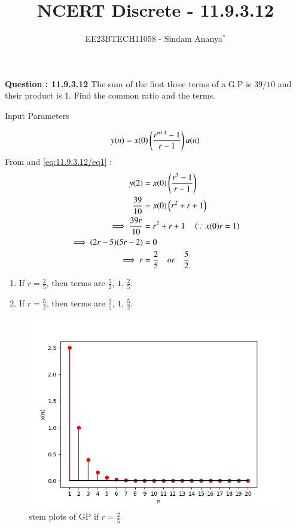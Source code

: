 \documentclass[journal,12pt,twocolumn]{IEEEtran}
\theoremstyle{remark}
\begin{document}

\vspace{3cm}

\title{NCERT Discrete - 11.9.3.12}
\author{EE23BTECH11058 - Sindam Ananya$^{*}$%
}
\maketitle
\newpage
\bigskip

\renewcommand{\thefigure}{\theenumi}
\renewcommand{\thetable}{\theenumi}

\vspace{3cm}
\textbf{Question : 11.9.3.12} 
The sum of the first three terms of a G.P is $39/10$ and their product is $1$. Find the common ratio and the terms.\\
\solution
\fi
\begin{table}[h!]
    \centering
    
    \caption{Input Parameters}
    \label{tab:11.9.3.12/table1}
\end{table}
\begin{equation}
y(n) = x(0)\left(\frac{r^{n+1}-1}{r-1}\right)u(n)
\label{eq:11.9.3.12/eq1}
\end{equation}
From  and \eqref{eq:11.9.3.12/eq1} :
\begin{align}
y(2) &= x(0)\left(\frac{r^3-1}{r-1}\right)\\
\frac{39}{10} &= x(0)\left(r^2+r+1\right)\\
\implies \frac{39r}{10} &= r^2+r+1 \quad \left(\because x(0)r = 1\right)\\
\implies (2r-5)(5r-2) &=0\\
\implies r &= \frac{2}{5} \quad or \quad \frac{5}{2}
\end{align}
\begin{enumerate}
      \item If $r = \frac{2}{5}$, then terms are $\frac{5}{2}$, $1$, $\frac{2}{5}$.
      \item If $r = \frac{5}{2}$, then terms are $\frac{2}{5}$, $1$, $\frac{5}{2}$.
\end{enumerate}
\begin{figure}[h!]
    \centering
    \includegraphics[width=\columnwidth]{ncert-maths/11/9/3/12/figs/graph1.png}
    \caption{stem plots of GP if $r=\frac{2}{5}$}
    \label{fig:1}
\end{figure}
\end{document}
